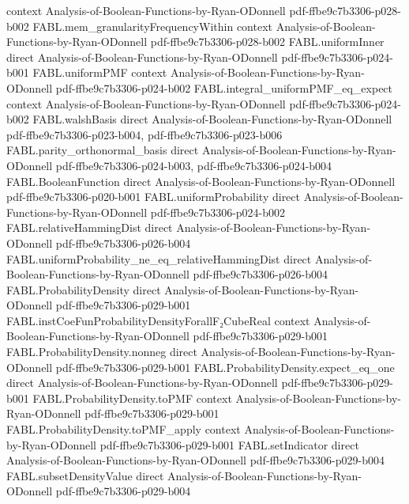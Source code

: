 \begin{theorem}
  {context}
  {Analysis-of-Boolean-Functions-by-Ryan-ODonnell}
  {pdf-ffbe9c7b3306-p028-b002}
\proofstep
  {FABL.mem_granularityFrequencyWithin}
  {context}
  {Analysis-of-Boolean-Functions-by-Ryan-ODonnell}
  {pdf-ffbe9c7b3306-p028-b002}
\proofstep
  {FABL.uniformInner}
  {direct}
  {Analysis-of-Boolean-Functions-by-Ryan-ODonnell}
  {pdf-ffbe9c7b3306-p024-b001}
\proofstep
  {FABL.uniformPMF}
  {context}
  {Analysis-of-Boolean-Functions-by-Ryan-ODonnell}
  {pdf-ffbe9c7b3306-p024-b002}
\proofstep
  {FABL.integral_uniformPMF_eq_expect}
  {context}
  {Analysis-of-Boolean-Functions-by-Ryan-ODonnell}
  {pdf-ffbe9c7b3306-p024-b002}
\proofstep
  {FABL.walshBasis}
  {direct}
  {Analysis-of-Boolean-Functions-by-Ryan-ODonnell}
  {pdf-ffbe9c7b3306-p023-b004,
    pdf-ffbe9c7b3306-p023-b006}
\proofstep
  {FABL.parity_orthonormal_basis}
  {direct}
  {Analysis-of-Boolean-Functions-by-Ryan-ODonnell}
  {pdf-ffbe9c7b3306-p024-b003,
    pdf-ffbe9c7b3306-p024-b004}
\proofstep
  {FABL.BooleanFunction}
  {direct}
  {Analysis-of-Boolean-Functions-by-Ryan-ODonnell}
  {pdf-ffbe9c7b3306-p020-b001}
\proofstep
  {FABL.uniformProbability}
  {direct}
  {Analysis-of-Boolean-Functions-by-Ryan-ODonnell}
  {pdf-ffbe9c7b3306-p024-b002}
\proofstep
  {FABL.relativeHammingDist}
  {direct}
  {Analysis-of-Boolean-Functions-by-Ryan-ODonnell}
  {pdf-ffbe9c7b3306-p026-b004}
\proofstep
  {FABL.uniformProbability_ne_eq_relativeHammingDist}
  {direct}
  {Analysis-of-Boolean-Functions-by-Ryan-ODonnell}
  {pdf-ffbe9c7b3306-p026-b004}
\proofstep
  {FABL.ProbabilityDensity}
  {direct}
  {Analysis-of-Boolean-Functions-by-Ryan-ODonnell}
  {pdf-ffbe9c7b3306-p029-b001}
\proofstep
  {FABL.instCoeFunProbabilityDensityForallF₂CubeReal}
  {context}
  {Analysis-of-Boolean-Functions-by-Ryan-ODonnell}
  {pdf-ffbe9c7b3306-p029-b001}
\proofstep
  {FABL.ProbabilityDensity.nonneg}
  {direct}
  {Analysis-of-Boolean-Functions-by-Ryan-ODonnell}
  {pdf-ffbe9c7b3306-p029-b001}
\proofstep
  {FABL.ProbabilityDensity.expect_eq_one}
  {direct}
  {Analysis-of-Boolean-Functions-by-Ryan-ODonnell}
  {pdf-ffbe9c7b3306-p029-b001}
\proofstep
  {FABL.ProbabilityDensity.toPMF}
  {context}
  {Analysis-of-Boolean-Functions-by-Ryan-ODonnell}
  {pdf-ffbe9c7b3306-p029-b001}
\proofstep
  {FABL.ProbabilityDensity.toPMF_apply}
  {context}
  {Analysis-of-Boolean-Functions-by-Ryan-ODonnell}
  {pdf-ffbe9c7b3306-p029-b001}
\proofstep
  {FABL.setIndicator}
  {direct}
  {Analysis-of-Boolean-Functions-by-Ryan-ODonnell}
  {pdf-ffbe9c7b3306-p029-b004}
\proofstep
  {FABL.subsetDensityValue}
  {direct}
  {Analysis-of-Boolean-Functions-by-Ryan-ODonnell}
  {pdf-ffbe9c7b3306-p029-b004}

\end{theorem}
